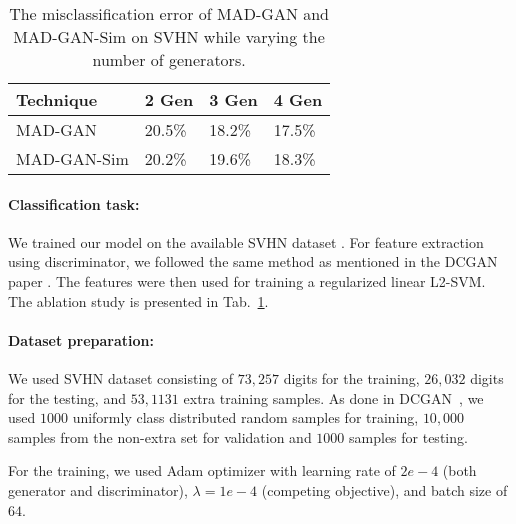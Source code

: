 \begin{center}
	\begin{table}
		\begin{tabular}{ |m{4.5em} |m{4.5em} |m{4.5em} |m{4.5em} |} 
			\hline
			\textbf{Technique} & \textbf{2 Gen} & \textbf{3 Gen} & \textbf{4 Gen} \\
			\hline
			MAD-GAN & 20.5\% & 18.2\% & 17.5\% \\
			\hline
			MAD-GAN-Sim & 20.2\% & 19.6\% & 18.3\% \\
			\hline
		\end{tabular}
		\caption{\label{tab:dcgan-svhn} The misclassification error of MAD-GAN and MAD-GAN-Sim on SVHN while varying the number of generators.}
	\end{table}
\end{center}

\paragraph{Classification task:} We trained our model on the available SVHN dataset \cite{Netzer11SVHN}. For feature extraction using discriminator, we followed the same method as mentioned in the DCGAN paper \cite{radford2015unsupervised}. The features were then used for training a regularized linear L2-SVM. The ablation study is presented in Tab.~\ref{tab:dcgan-svhn}.

\paragraph{Dataset preparation:} We used SVHN dataset \cite{Netzer11SVHN} consisting of $73,257$ digits for the training, $26,032$ digits for the testing, and $53,1131$ extra training samples. As done in DCGAN~\cite{radford2015unsupervised}, we used $1000$ uniformly class distributed random samples for training, $10,000$ samples from the non-extra set for validation and $1000$ samples for testing.

For the training, we used Adam optimizer with learning rate of $2e-4$ (both generator and discriminator), $\lambda = 1e-4$ (competing objective), and batch size of $64$.